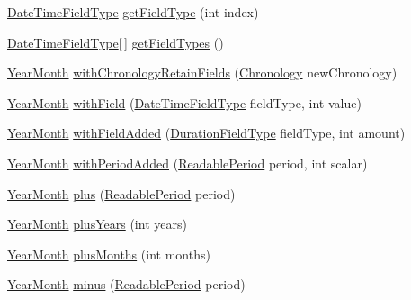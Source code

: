 \begin{DoxyCompactItemize}
\hyperlink{classorg_1_1joda_1_1time_1_1_date_time_field_type}{Date\-Time\-Field\-Type} \hyperlink{classorg_1_1joda_1_1time_1_1_year_month_a0e4e7a6a9ae7b9f02c07b2acbe86739d}{get\-Field\-Type} (int index)
\item 
\hyperlink{classorg_1_1joda_1_1time_1_1_date_time_field_type}{Date\-Time\-Field\-Type}\mbox{[}$\,$\mbox{]} \hyperlink{classorg_1_1joda_1_1time_1_1_year_month_ac6c7baa1f1f33fceaf487e0a2fdf471d}{get\-Field\-Types} ()
\item 
\hyperlink{classorg_1_1joda_1_1time_1_1_year_month}{Year\-Month} \hyperlink{classorg_1_1joda_1_1time_1_1_year_month_ad10529075bfa363f084f9d4037150fbc}{with\-Chronology\-Retain\-Fields} (\hyperlink{classorg_1_1joda_1_1time_1_1_chronology}{Chronology} new\-Chronology)
\item 
\hyperlink{classorg_1_1joda_1_1time_1_1_year_month}{Year\-Month} \hyperlink{classorg_1_1joda_1_1time_1_1_year_month_aad3f53d3994f5f7ff9d7b428f32b9cd7}{with\-Field} (\hyperlink{classorg_1_1joda_1_1time_1_1_date_time_field_type}{Date\-Time\-Field\-Type} field\-Type, int value)
\item 
\hyperlink{classorg_1_1joda_1_1time_1_1_year_month}{Year\-Month} \hyperlink{classorg_1_1joda_1_1time_1_1_year_month_a3cee7f3091048b9b4809bcb38eecf050}{with\-Field\-Added} (\hyperlink{classorg_1_1joda_1_1time_1_1_duration_field_type}{Duration\-Field\-Type} field\-Type, int amount)
\item 
\hyperlink{classorg_1_1joda_1_1time_1_1_year_month}{Year\-Month} \hyperlink{classorg_1_1joda_1_1time_1_1_year_month_a5858c53fb63431606598d0efe5a69e20}{with\-Period\-Added} (\hyperlink{interfaceorg_1_1joda_1_1time_1_1_readable_period}{Readable\-Period} period, int scalar)
\item 
\hyperlink{classorg_1_1joda_1_1time_1_1_year_month}{Year\-Month} \hyperlink{classorg_1_1joda_1_1time_1_1_year_month_a4433d93bb1e1d085d7acb282d3428dec}{plus} (\hyperlink{interfaceorg_1_1joda_1_1time_1_1_readable_period}{Readable\-Period} period)
\item 
\hyperlink{classorg_1_1joda_1_1time_1_1_year_month}{Year\-Month} \hyperlink{classorg_1_1joda_1_1time_1_1_year_month_a22b8f9ac6c457357d88f7c594cf7178f}{plus\-Years} (int years)
\item 
\hyperlink{classorg_1_1joda_1_1time_1_1_year_month}{Year\-Month} \hyperlink{classorg_1_1joda_1_1time_1_1_year_month_a4b8847be7598840708609bf40a6b54d1}{plus\-Months} (int months)
\item 
\hyperlink{classorg_1_1joda_1_1time_1_1_year_month}{Year\-Month} \hyperlink{classorg_1_1joda_1_1time_1_1_year_month_ae624c7b44902399e4fe68f003ed76748}{minus} (\hyperlink{interfaceorg_1_1joda_1_1time_1_1_readable_period}{Readable\-Period} period)

\end{DoxyCompactItemize}
